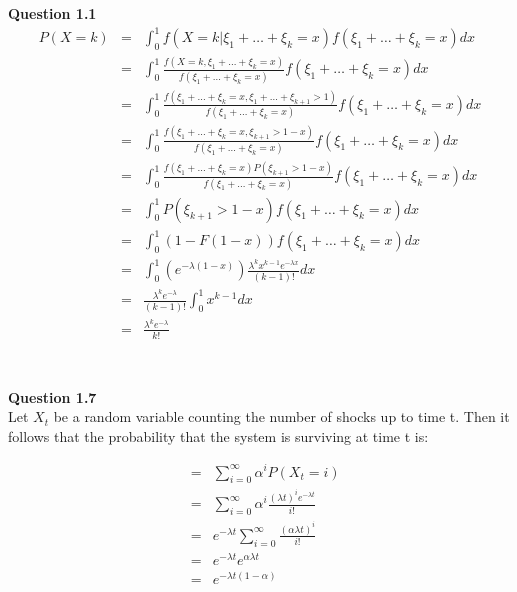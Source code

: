 \documentclass[10pt,a4paper]{article}
\begin{document}
\begin{flushleft}

\begin{eqnarray*}
\\
\end{eqnarray*}




\textbf{Question 1.1}\\
\begin{eqnarray*}
P(X=k)&=&\int_0^1 f(X=k|\xi_1+\ldots+\xi_k=x)f(\xi_1+\ldots+\xi_k=x)dx \\
&=&\int_0^1 \frac{f(X=k,\xi_1+\ldots+\xi_k=x)}{f(\xi_1+\ldots+\xi_k=x)}f(\xi_1+\ldots+\xi_k=x)dx \\
&=&\int_0^1 \frac{f(\xi_1+\ldots+\xi_k=x,\xi_1+\ldots+\xi_{k+1}>1)}{f(\xi_1+\ldots+\xi_k=x)}f(\xi_1+\ldots+\xi_k=x)dx \\
&=&\int_0^1 \frac{f(\xi_1+\ldots+\xi_k=x,\xi_{k+1}>1-x)}{f(\xi_1+\ldots+\xi_k=x)}f(\xi_1+\ldots+\xi_k=x)dx \\
&=&\int_0^1 \frac{f(\xi_1+\ldots+\xi_k=x)P(\xi_{k+1}>1-x)}{f(\xi_1+\ldots+\xi_k=x)}f(\xi_1+\ldots+\xi_k=x)dx \\
&=&\int_0^1 P(\xi_{k+1}>1-x)f(\xi_1+\ldots+\xi_k=x)dx \\
&=&\int_0^1 (1-F(1-x))f(\xi_1+\ldots+\xi_k=x)dx \\
&=&\int_0^1 (e^{-\lambda(1-x)})\frac{\lambda^k x^{k-1} e^{-\lambda x}}{(k-1)!}dx \\
&=&\frac{\lambda^k e^{-\lambda}}{(k-1)!} \int_0^1  x^{k-1} dx \\
&=&\frac{\lambda^k e^{-\lambda}}{k!}\\
\end{eqnarray*}



\begin{eqnarray*}
\\
\end{eqnarray*}

\textbf{Question 1.7}\\
Let $X_t$ be a random variable counting the number of shocks up to
time t.  Then it follows that the probability that the system is
surviving at time t is:

\begin{eqnarray*}
&=&\sum_{i=0}^{\infty} \alpha^i P(X_t=i)\\
&=&\sum_{i=0}^{\infty} \alpha^i \frac{(\lambda t)^i e^{-\lambda t}
}{i!}\\
&=& e^{-\lambda t} \sum_{i=0}^{\infty} \frac{(\alpha\lambda t)^i}
{i!}\\
&=&e^{-\lambda t} e^{\alpha\lambda t} \\
&=&e^{-\lambda t (1- \alpha)} \\
\end{eqnarray*}

\begin{eqnarray*}
\\
\end{eqnarray*}

\end{flushleft}
\end{document}
